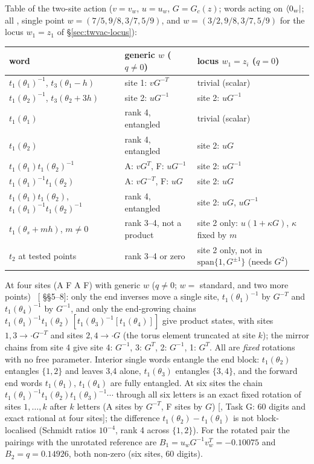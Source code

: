 Table of the two-site action ($v=v_w$, $u=u_w$, $G=G_c(z)$; words acting on $\langle0_w|$; all \ex, single point $w=(7/5,9/8,3/7,5/9)$, and $w=(3/2,9/8,3/7,5/9)$ for the locus
$w_1=z_1$ of \S\ref{sec:twvac-locus}):
\begin{center}
\begin{tabular}{p{}p{}p{}}
\toprule
word & generic $w$ ($q\ne0$) & locus $w_1=z_i$ ($q=0$)\\
\midrule
$t_1(\theta_1)^{-1}$, $t_3(\theta_1-h)$ & site 1: $vG^{-T}$ & trivial (scalar)\\
$t_1(\theta_2)^{-1}$, $t_3(\theta_2+3h)$ & site 2: $uG^{-1}$ & site 2: $uG^{-1}$\\
$t_1(\theta_1)$ & rank 4, entangled & trivial (scalar)\\
$t_1(\theta_2)$ & rank 4, entangled & site 2: $uG$\\
$t_1(\theta_1)t_1(\theta_2)^{-1}$ & A: $vG^{T}$, F: $uG^{-1}$ & site 2: $uG^{-1}$\\
$t_1(\theta_1)^{-1}t_1(\theta_2)$ & A: $vG^{-T}$, F: $uG$ & site 2: $uG$\\
$t_1(\theta_1)t_1(\theta_2)$, $t_1(\theta_1)^{-1}t_1(\theta_2)^{-1}$ & rank 4, entangled & site 2: $uG$, $uG^{-1}$\\
$t_1(\theta_s+mh)$, $m\ne0$ & rank 3--4, not a product & site 2 only: $u(1+\kappa G)$, $\kappa$ fixed by $m$\\
$t_2$ at tested points & rank 3--4 or zero & site 2 only, not in $\mathrm{span}\{1,G^{\pm1}\}$ (needs $G^2$)\\
\bottomrule
\end{tabular}
\end{center}
At four sites (A F A F) with generic $w$ ($q\neq0$; $w=$ standard, and two more points) \ex\ [ \S\S5--8]: only the end inverses move a single site,
$t_1(\theta_1)^{-1}$ by $G^{-T}$ and $t_1(\theta_4)^{-1}$ by $G^{-1}$, and only the end-growing chains
$t_1(\theta_1)^{-1}t_1(\theta_2)\,[t_1(\theta_3)^{-1}[t_1(\theta_4)]]$ give product states, with sites $1,3\to\cdot G^{-T}$ and sites $2,4\to\cdot G$
(the torus element truncated at site $k$); the mirror chains from site 4 give site 4: $G^{-1}$, 3: $G^{T}$, 2: $G^{-1}$, 1: $G^T$. All are \emph{fixed} rotations with no free
parameter. Interior single words entangle the end block: $t_1(\theta_2)$ entangles $\{1,2\}$ and leaves 3,4 alone, $t_1(\theta_3)$ entangles $\{3,4\}$, and the forward end words
$t_1(\theta_1)$, $t_1(\theta_4)$ are fully entangled. At six sites the chain $t_1(\theta_1)^{-1}t_1(\theta_2)t_1(\theta_3)^{-1}\cdots$ through all six letters is an exact fixed rotation of sites $1,\dots,k$
after $k$ letters (A sites by $G^{-T}$, F sites by $G$) [, Task G: 60 digits and exact rational at four sites]; the difference $t_1(\theta_2)-t_1(\theta_1)$ is not
block-localised (Schmidt ratios $10^{-4}$, rank 4 across $\{1,2\}$). For the rotated pair the pairings with the unrotated reference are
$B_1=u_wG^{-1}v_w^T=-0.10075$ and $B_2=q=0.14926$, both non-zero (six sites, 60 digits).

